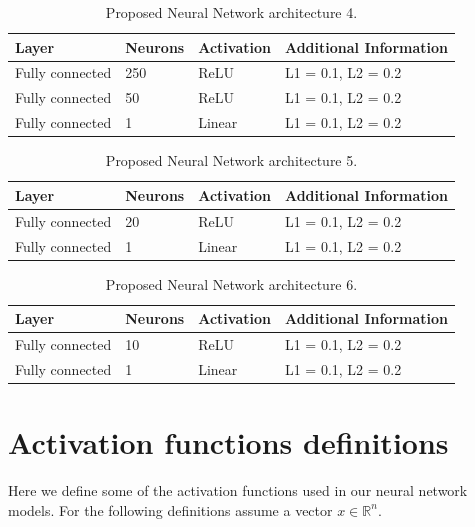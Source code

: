 \documentclass[preprint,12pt]{elsarticle}%
\begin{document}
\begin{table}[!htb]
\centering
\caption{Proposed Neural Network architecture 4.}%
\begin{tabular}
[c]{llll}\hline
Layer & Neurons & Activation & Additional Information\\\hline
Fully connected & 250 & ReLU & L1 = 0.1, L2 = 0.2\\
Fully connected & 50 & ReLU & L1 = 0.1, L2 = 0.2\\
Fully connected & 1 & Linear & L1 = 0.1, L2 = 0.2\\\hline
\end{tabular}
\label{table:proposed_nn_4}%
\end{table}

\begin{table}[!htb]
\centering
\caption{Proposed Neural Network architecture 5.}%
\begin{tabular}
[c]{llll}\hline
Layer & Neurons & Activation & Additional Information\\\hline\hline
Fully connected & 20 & ReLU & L1 = 0.1, L2 = 0.2\\
Fully connected & 1 & Linear & L1 = 0.1, L2 = 0.2\\\hline
\end{tabular}
\label{table:proposed_nn_5}%
\end{table}

\begin{table}[!htb]
\centering
\caption{Proposed Neural Network architecture 6.}%
\begin{tabular}
[c]{llll}\hline
Layer & Neurons & Activation & Additional Information\\\hline\hline
Fully connected & 10 & ReLU & L1 = 0.1, L2 = 0.2\\
Fully connected & 1 & Linear & L1 = 0.1, L2 = 0.2\\\hline
\end{tabular}
\label{table:proposed_nn_6}%
\end{table}


\pagebreak

\section{Activation functions definitions}
\label{appendix:activation_definitions}

Here we define some of the activation functions used in our neural network models. For the following definitions assume a vector $x \in \mathbb{R}^n$.
\end{document}
